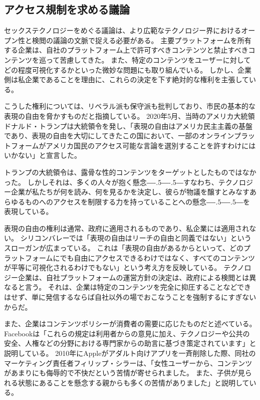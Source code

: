 \documentclass[paper=a4,book,openany]{jlreq}
\def\DDASH{―\kern-.5\zw―\kern-.5\zw―}
\begin{document}
\subsection{アクセス規制を求める議論}

セックステクノロジーをめぐる議論は、より広範なテクノロジー界におけるオープン性と検閲の議論の文脈で捉える必要がある。
主要プラットフォームを所有する企業は、自社のプラットフォーム上で許可すべきコンテンツと禁止すべきコンテンツを巡って苦慮してきた。
また、特定のコンテンツをユーザーに対してどの程度可視化するかといった微妙な問題にも取り組んでいる\citep{economist20:_social_medias_strug_self}。
しかし、企業側は私企業であることを理由に、これらの決定を下す絶対的な権利を主張している。

こうした権利については、リベラル派も保守派も批判しており、市民の基本的な表現の自由を脅かすものだと指摘している。
2020年5月、当時のアメリカ大統領ドナルド・トランプは大統領令を発し、「表現の自由はアメリカ民主主義の基盤であり、表現の自由を大切にしてきたこの国において、一部のオンラインプラットフォームがアメリカ国民のアクセス可能な言論を選別することを許すわけにはいかない」と宣言した\citep{house20:_execut_order_preven_onlin_censor,lakier21:_great_free_speec_rever}。

トランプの大統領令は、露骨な性的コンテンツをターゲットとしたものではなかった。
しかしそれは、多くの人々が抱く懸念{\DDASH}すなわち、テクノロジー企業が私たちが何を読み、何を見るかを決定し、彼らが物議を醸すとみなすあらゆるものへのアクセスを制限する力を持っていることへの懸念{\DDASH}を表現している。

表現の自由の権利は通常、政府に適用されるものであり、私企業には適用されない。
シリコンバレーでは「表現の自由はリーチの自由と同義ではない」というスローガンが広まっている。
これは「表現の自由があるからといって、どのプラットフォームにでも自由にアクセスできるわけではなく、すべてのコンテンツが平等に可視化されるわけでもない」という考え方を反映している。
テクノロジー企業は、自社プラットフォームの運営方針の決定は、政府による検閲とは異なると言う。
それは、企業は特定のコンテンツを完全に抑圧することなどできはせず、単に発信するならば自社以外の場でおこなうことを強制するにすぎないからだ。

また、企業はコンテンツポリシーが消費者の需要に応じたものだと述べている。
Facebookは「これらの規定は利用者からの意見に加え、テクノロジーや公共の安全、人権などの分野における専門家からの助言に基づき策定されています」と説明している\citep{facebook25:_commun_stand}。
2010年にAppleがアダルト向けアプリを一斉削除した際、同社のマーケティング責任者フィリップ・シラーは、「女性ユーザーから、コンテンツがあまりにも侮辱的で不快だという苦情が寄せられました。
また、子供が見られる状態にあることを懸念する親からも多くの苦情がありました」と説明している\citep{wortham10:_apple_bans_some_apps_sex_tinged_conten}。
\end{document}
